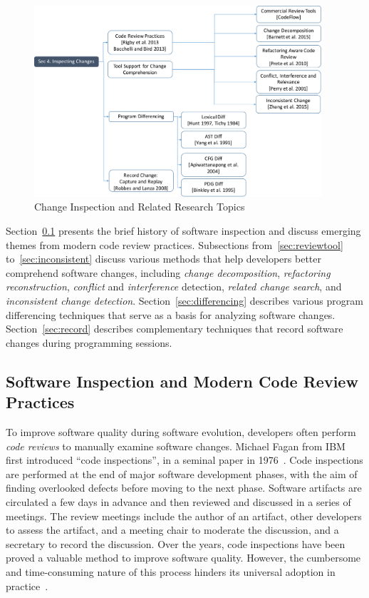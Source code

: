 
\begin{figure}[ht]
 \centering
 \includegraphics[width=0.95\textwidth]{images/ChangeInspection.pdf}
 \caption{Change Inspection and Related Research Topics} 
 \label{fig:changeinspection} 
\end{figure}

Section~\ref{sec:codereview} presents the brief history of software inspection and discuss emerging themes from modern code review practices. Subsections from~\ref{sec:reviewtool} to~\ref{sec:inconsistent} discuss various methods that help developers better comprehend software changes, including {\em change decomposition}, {\em refactoring reconstruction}, {\em conflict} and {\em interference} detection, {\em related change search}, and {\em inconsistent change detection}. Section~\ref{sec:differencing} describes various program differencing techniques that serve as a basis for analyzing software changes. Section~\ref{sec:record} describes complementary techniques that record software changes during programming sessions. 


\subsection{Software Inspection and Modern Code Review Practices} 
\label{sec:codereview}

To improve software quality during software evolution, developers often perform {\em code reviews} to manually examine software changes. Michael Fagan from IBM first introduced ``code inspections'', in a seminal paper in 1976~\cite{Fagan1999:checklist}. Code inspections are performed at the end of major software development phases, with the aim of finding overlooked defects before moving to the next phase. Software artifacts are circulated a few days in advance and then reviewed and discussed in a series of meetings. The review meetings include the author of an artifact, other developers to assess the artifact, and a meeting chair to moderate the discussion, and a secretary to record the discussion. Over the years, code inspections have been proved a valuable method to improve software quality. However, the cumbersome and time-consuming nature of this process hinders its universal adoption in practice~\cite{johnson1998reengineering}. 

